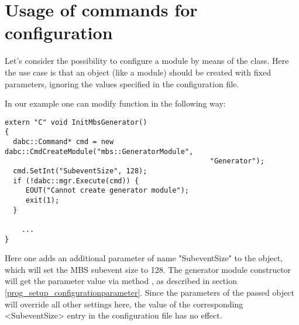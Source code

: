 \section{Usage of commands for configuration}
\label{prog_setup_configuration_commands}
Let's consider the possibility to configure a module by means of the  class.
Here the use case is that
an object (like a module) should be created with fixed parameters,
ignoring the values specified in the configuration file.

In our example one can modify  function in the following way:
\begin{small}
\begin{verbatim}
extern "C" void InitMbsGenerator() 
{
  dabc::Command* cmd = new dabc::CmdCreateModule("mbs::GeneratorModule", 
                                                 "Generator");
  cmd.SetInt("SubeventSize", 128);
  if (!dabc::mgr.Execute(cmd)) {
     EOUT("Cannot create generator module");
     exit(1);
  }
    
    ...
}
\end{verbatim}
\end{small}

Here one adds an additional parameter of name "SubeventSize" to
the  object, 
which will set the MBS subevent size to 128. 
The generator module constructor will get the parameter value via method
, as described in section \ref{prog_setup_configurationparameter}.
Since the parameters of the passed  object will override all other settings here,
the value of the corresponding <SubeventSize> entry in the configuration file has no effect.

